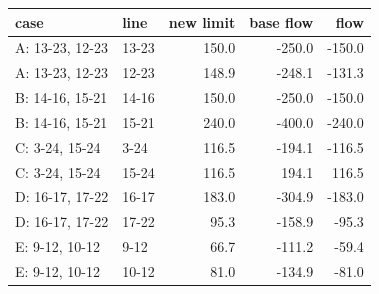 \begin{tabular}{llrrr}
\toprule
case & line & new limit & base flow & flow \\
\midrule
A: 13-23, 12-23 & 13-23 & 150.0 & -250.0 & -150.0 \\
A: 13-23, 12-23 & 12-23 & 148.9 & -248.1 & -131.3 \\
B: 14-16, 15-21 & 14-16 & 150.0 & -250.0 & -150.0 \\
B: 14-16, 15-21 & 15-21 & 240.0 & -400.0 & -240.0 \\
C: 3-24, 15-24 & 3-24 & 116.5 & -194.1 & -116.5 \\
C: 3-24, 15-24 & 15-24 & 116.5 & 194.1 & 116.5 \\
D: 16-17, 17-22 & 16-17 & 183.0 & -304.9 & -183.0 \\
D: 16-17, 17-22 & 17-22 & 95.3 & -158.9 & -95.3 \\
E: 9-12, 10-12 & 9-12 & 66.7 & -111.2 & -59.4 \\
E: 9-12, 10-12 & 10-12 & 81.0 & -134.9 & -81.0 \\
\bottomrule
\end{tabular}
